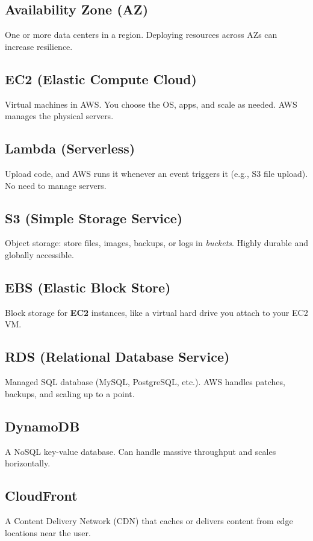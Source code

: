 \documentclass[12pt]{article}
\begin{document}
\subsection*{Availability Zone (AZ)}
One or more data centers in a region. Deploying resources across AZs can increase resilience.

\subsection*{EC2 (Elastic Compute Cloud)}
Virtual machines in AWS. You choose the OS, apps, and scale as needed. AWS manages the physical servers.

\subsection*{Lambda (Serverless)}
Upload code, and AWS runs it whenever an event triggers it (e.g., S3 file upload). No need to manage servers.

\subsection*{S3 (Simple Storage Service)}
Object storage: store files, images, backups, or logs in \textit{buckets}. Highly durable and globally accessible.

\subsection*{EBS (Elastic Block Store)}
Block storage for \textbf{EC2} instances, like a virtual hard drive you attach to your EC2 VM.

\subsection*{RDS (Relational Database Service)}
Managed SQL database (MySQL, PostgreSQL, etc.). AWS handles patches, backups, and scaling up to a point.

\subsection*{DynamoDB}
A NoSQL key-value database. Can handle massive throughput and scales horizontally.

\subsection*{CloudFront}
A Content Delivery Network (CDN) that caches or delivers content from edge locations near the user.
\end{document}
